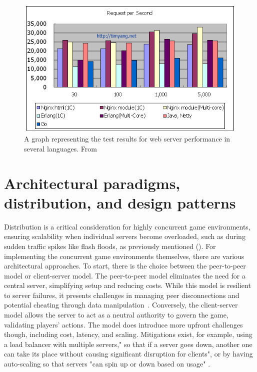 \documentclass[]{final}
\begin{document}
\begin{figure}[ht!]
  \centering
  \includegraphics[width=.8\linewidth]{c_erlang_java_go}
  \caption{A graph representing the test results for web server performance in several languages. From \cite{yang_c_nodate}}
  \label{fig: 1}
\end{figure}


\chapter{Architectural paradigms, distribution, and design patterns}

Distribution is a critical consideration for highly concurrent game
environments, ensuring scalability when individual servers become
overloaded, such as during sudden traffic spikes like flash floods, as
previously mentioned {\hypersetup{linkcolor=teal}(\pageref{rationale_problem})}.
For implementing the concurrent game environments themselves, there are various architectural approaches.
To start, there is the choice between the peer-to-peer model or client-server model.
The peer-to-peer model eliminates the need for a central server, simplifying setup and
reducing costs. While this model is resilient to server failures, it presents challenges
in managing peer disconnections and potential cheating through data manipulation~\cite{franchetti_coping_2020}.
Conversely, the client-server model allows the server to act as a neutral authority to govern the game,
validating players' actions. The model does introduce more upfront challenges though, including cost,
latency, and scaling. Mitigations exist, for example, using a load balancer with multiple servers," so
that if a server goes down, another one can take its place without causing significant
disruption for clients", or by having auto-scaling so that servers "can spin up or down
based on usage" \cite{pandey_peer--peer_2022}.
\end{document}
